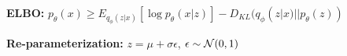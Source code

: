 \textbf{ELBO:} $p_\theta(x) \geq E_{q_\phi(z|x)}[\log p_\theta(x|z)] - D_{KL}(q_\phi(z|x) || p_\theta(z))$\\

\textbf{Re-parameterization:} $z = \mu + \sigma \epsilon$, $\epsilon \sim \mathcal{N}(0,1)$\\


